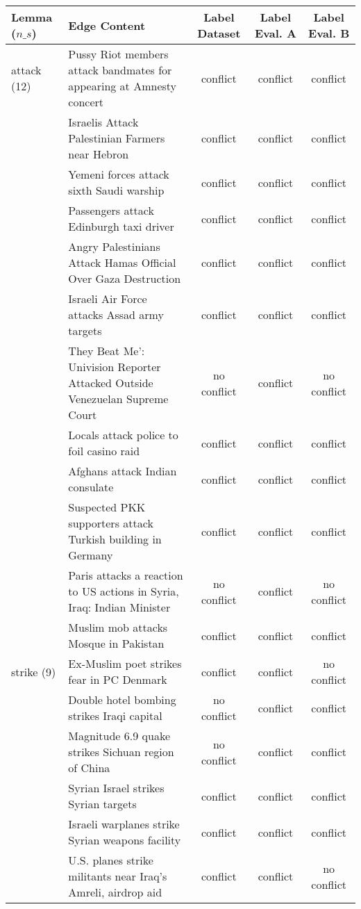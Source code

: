 \begin{sidewaystable}[ht]
\centering
\begin{tabular}{l p{13cm} ccc}
\toprule
Lemma (\(n\_s\)) & Edge Content & Label Dataset & Label Eval. A & Label Eval. B \\
\midrule
\hline
attack (12)
& Pussy Riot members attack bandmates for appearing at Amnesty concert & conflict & conflict & conflict \\
& Israelis Attack Palestinian Farmers near Hebron & conflict & conflict & conflict \\
& Yemeni forces attack sixth Saudi warship & conflict & conflict & conflict \\
& Passengers attack Edinburgh taxi driver & conflict & conflict & conflict \\
& Angry Palestinians Attack Hamas Official Over Gaza Destruction & conflict & conflict & conflict \\
& Israeli Air Force attacks Assad army targets & conflict & conflict & conflict \\
& They Beat Me’: Univision Reporter Attacked Outside Venezuelan Supreme Court & no conflict & conflict & no conflict \\
& Locals attack police to foil casino raid & conflict & conflict & conflict \\
& Afghans attack Indian consulate & conflict & conflict & conflict \\
& Suspected PKK supporters attack Turkish building in Germany & conflict & conflict & conflict \\
& Paris attacks a reaction to US actions in Syria, Iraq: Indian Minister & no conflict & conflict & no conflict \\
& Muslim mob attacks Mosque in Pakistan & conflict & conflict & conflict \\
\hline
strike (9)
& Ex-Muslim poet strikes fear in PC Denmark & conflict & conflict & no conflict \\
& Double hotel bombing strikes Iraqi capital & no conflict & conflict & conflict \\
& Magnitude 6.9 quake strikes Sichuan region of China & no conflict & conflict & conflict \\
& Syrian Israel strikes Syrian targets & conflict & conflict & conflict \\
& Israeli warplanes strike Syrian weapons facility & conflict & conflict & conflict \\
& U.S. planes strike militants near Iraq's Amreli, airdrop aid & conflict & conflict & no conflict \\

\end{tabular}
\end{sidewaystable}
